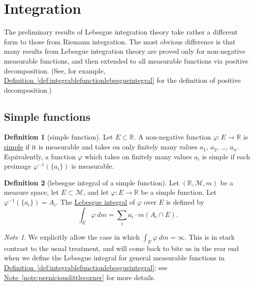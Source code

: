 \documentclass[a4paper,12pt]{scrreprt}
\newcommand{\R}{\mathbb{R}}
\newcommand{\defn}[1]{\ul{#1}}
\theoremstyle{definition}
\newtheorem{definition}{Definition}[section]
\theoremstyle{plain}
\theoremstyle{remark}
\newtheorem{note}{Note}[section]
\begin{document}
\section{Integration}
The preliminary results of Lebesgue integration theory take rather a different form to those from Riemann integration. The most obvious difference is that many results from Lebesgue integration theory are proved only for non-negative measurable functions, and then extended to all measurable functions via positive decomposition. (See, for example, \hyperref[def:integrablefunctionlebesgueintegral]{Definition~\ref*{def:integrablefunctionlebesgueintegral}} for the definition of positive decomposition.)

\subsection{Simple functions}

\begin{definition}[simple function]
  \label{def:simplefunction}
  Let $E \subset \R$. A non-negative function $\varphi\colon E \to \R$ is \defn{simple} if it is measurable and takes on only finitely many values $a_{1}$, $a_{2}$, \ldots, $a_{n}$. Equivalently, a function $\varphi$ which takes on finitely many values $a_{i}$ is simple if each preimage $\varphi^{-1}(\{a_{i}\})$ is measurable.
\end{definition}

\begin{definition}[lebesgue integral of a simple function]
  \label{def:lebesgueintegralofsimplefunction}
  Let $(\R, \mathcal{M}, m)$ be a measure space, let $E \subset \mathcal{M}$, and let $\varphi\colon E \to \R$ be a simple function. Let $ \varphi^{-1}\left( \{ a_{i} \} \right) = A_{i}$. The \defn{Lebesgue integral} of $\varphi$ over $E$ is defined by
  \begin{equation*}
    \int_{E} \varphi\ dm = \sum_{i} a_{i}\cdot m(A_{i} \cap E).
  \end{equation*}
\end{definition}

\begin{note}
  We explicitly allow the case in which $\int_{E} \varphi\ dm = \infty$. This is in stark contrast to the usual treatment, and will come back to bite us in the rear end when we define the Lebesgue integral for general measurable functions in \hyperref[def:integrablefunctionlebesgueintegral]{Definition~\ref*{def:integrablefunctionlebesgueintegral}}; see \hyperref[note:perniciouslittlecorner]{Note~\ref*{note:perniciouslittlecorner}} for more details.
\end{note}
\end{document}

